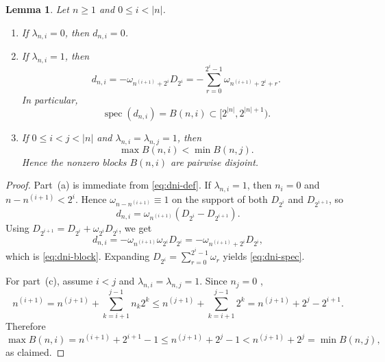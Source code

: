 \documentclass[11pt]{amsart}
\numberwithin{equation}{section}
\DeclareMathOperator{\spec}{spec}
\newtheorem{lemma}[theorem]{Lemma}
\theoremstyle{remark}
\begin{document}
\begin{lemma}
\label{lem:block-form} Let $n\ge1$ and $0\le i<|n|$.

\begin{enumerate} [label=(\alph*)]


\item If $\lambda_{n,i}=0$, then $d_{n,i}=0$.

\item If $\lambda_{n,i}=1$, then 
\begin{equation}
d_{n,i}=-\omega_{n^{(i+1)}+2^i}D_{2^i}
=-\sum_{r=0}^{2^i-1}\omega_{n^{(i+1)}+2^i+r}.  \label{eq:dni-block}
\end{equation}
In particular, 
\begin{equation}
\spec(d_{n,i})=B(n,i)\subset [2^{|n|},2^{|n|+1}).  \label{eq:dni-spec}
\end{equation}

\item If $0\le i<j<|n|$ and $\lambda_{n,i}=\lambda_{n,j}=1$, then 
\begin{equation}
\max B(n,i)<\min B(n,j).  \label{eq:blocks-disjoint}
\end{equation}
Hence the nonzero blocks $B(n,i)$ are pairwise disjoint.
\end{enumerate}
\end{lemma}

\begin{proof}
Part~(a) is immediate from \eqref{eq:dni-def}. If $\lambda_{n,i}=1$, then $%
n_i=0$ and $n-n^{(i+1)}<2^i$. Hence $\omega_{n-n^{(i+1)}}\equiv1$ on the
support of both $D_{2^i}$ and $D_{2^{i+1}}$, so 
\begin{equation*}
d_{n,i}=\omega_{n^{(i+1)}}(D_{2^i}-D_{2^{i+1}}). 
\end{equation*}
Using $D_{2^{i+1}}=D_{2^i}+\omega_{2^i}D_{2^i}$, we get 
\begin{equation*}
d_{n,i}=-\omega_{n^{(i+1)}}\omega_{2^i}D_{2^i}
=-\omega_{n^{(i+1)}+2^i}D_{2^i}, 
\end{equation*}
which is \eqref{eq:dni-block}. Expanding $D_{2^i}=\sum_{r=0}^{2^i-1}\omega_r$
yields \eqref{eq:dni-spec}.

For part~(c), assume $i<j$ and $\lambda_{n,i}=\lambda_{n,j}=1$. Since $n_j=0$%
, 
\begin{equation*}
n^{(i+1)}=n^{(j+1)}+\sum_{k=i+1}^{j-1}n_k2^k \le
n^{(j+1)}+\sum_{k=i+1}^{j-1}2^k = n^{(j+1)}+2^j-2^{i+1}. 
\end{equation*}
Therefore 
\begin{equation*}
\max B(n,i)=n^{(i+1)}+2^{i+1}-1\le n^{(j+1)}+2^j-1< n^{(j+1)}+2^j=\min
B(n,j), 
\end{equation*}
as claimed.
\end{proof}
\end{document}
